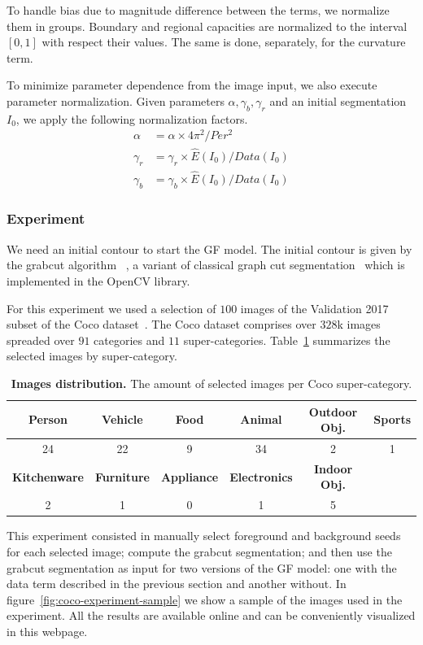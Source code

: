\documentclass[smallextended]{svjour3}
\begin{document}
%
%
To handle bias due to magnitude difference between the terms, we normalize them in groups. Boundary and regional capacities are normalized to the interval $[0,1]$ with respect their values. The same is done, separately, for the curvature term.

To minimize parameter dependence from the image input, we also execute parameter normalization. Given parameters $\alpha, \gamma_b, \gamma_r$ and an initial segmentation $I_0$, we apply the following normalization factors.
%
\begin{align*}
	\alpha & = \alpha \times 4\pi^2/Per^2 \\
	\gamma_r & = \gamma_r \times \hat{E}(I_0)/Data(I_0) \\	
	\gamma_b & = \gamma_b \times \hat{E}(I_0)/Data(I_0)		
\end{align*}
%
%
\subsubsection{Experiment}
We need an initial contour to start the GF model. The initial contour is given by the grabcut algorithm ~\cite{rother04grabcut}, a variant of classical graph cut segmentation~\cite{boykov01graphcut} which is implemented in the OpenCV library.

For this experiment we used a selection of $100$ images of the Validation 2017 subset of the Coco dataset~\cite{lin2014microsoft}. The Coco dataset comprises over $328$k images spreaded over $91$ categories and $11$ super-categories. Table~\ref{tab:image-categories-distribution} summarizes the selected images by super-category. 
%
%
\begin{table}
\begin{tabular}{cccccc}
\hline
\textbf{Person} & \textbf{Vehicle} & \textbf{Food} & \textbf{Animal} & \textbf{Outdoor Obj.} & \textbf{Sports} \\
\hline
24 & 22 & 9 & 34 & 2 & 1 \\
\hline
\textbf{Kitchenware} & \textbf{Furniture} & \textbf{Appliance} & \textbf{Electronics} & \textbf{Indoor Obj.} & \\
\hline
2 & 1 & 0 & 1 & 5 & \\
\hline
\end{tabular}
\caption{\textbf{Images distribution.} The amount of selected images per Coco super-category.}
\label{tab:image-categories-distribution}
\end{table}
%
%

This experiment consisted in manually select foreground and background seeds for each selected image; compute the grabcut segmentation; and then use the grabcut segmentation as input for two versions of the GF model: one with the data term described in the previous section and another without. In figure~\ref{fig:coco-experiment-sample} we show a sample of the images used in the experiment. All the results are available online and can be conveniently visualized in this webpage. 
\end{document}
